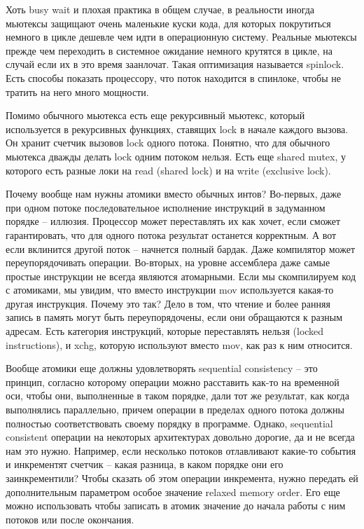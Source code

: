 \documentclass[12pt, a4paper]{article}
\begin{document}
Хоть busy wait и плохая практика в общем случае, в реальности иногда мьютексы защищают очень маленькие куски кода, для которых покрутиться немного в цикле дешевле чем идти в операционную систему. Реальные мьютексы прежде чем переходить в системное ожидание немного крутятся в цикле, на случай если их в это время заанлочат. Такая оптимизация называется spinlock. Есть способы показать процессору, что поток находится в спинлоке, чтобы не тратить на него много мощности.
\par Помимо обычного мьютекса есть еще рекурсивный мьютекс, который используется в рекурсивных функциях, ставящих lock в начале каждого вызова. Он хранит счетчик вызовов lock одного потока. Понятно, что для обычного мьютекса дважды делать lock одним потоком нельзя. Есть еще shared mutex, у которого есть разные локи на read (shared lock) и на write (exclusive lock).\\
\par Почему вообще нам нужны атомики вместо обычных интов? Во-первых, даже при одном потоке последовательное исполнение инструкций в задуманном порядке -- иллюзия. Процессор может переставлять их как хочет, если сможет гарантировать, что для одного потока результат останется корректным. А вот если вклинится другой поток -- начнется полный бардак. Даже компилятор может переупорядочивать операции. Во-вторых, на уровне ассемблера даже самые простые инструкции не всегда являются атомарными. Если мы скомпилируем код с атомиками, мы увидим, что вместо инструкции mov используется какая-то другая инструкция. Почему это так? Дело в том, что чтение и более ранняя запись в память могут быть переупорядочены, если они обращаются к разным адресам. Есть категория инструкций, которые переставлять нельзя (locked instructions), и xchg, которую используют вместо mov, как раз к ним относится.
\par Вообще атомики еще должны удовлетворять sequential consistency -- это принцип, согласно которому операции можно расставить как-то на временной оси, чтобы они, выполненные в таком порядке, дали тот же результат, как когда выполнялись параллельно, причем операции в пределах одного потока должны полностью соответствовать своему порядку в программе. Однако, sequential consistent операции на некоторых архитектурах довольно дорогие, да и не всегда нам это нужно. Например, если несколько потоков отлавливают какие-то события и инкрементят счетчик -- какая разница, в каком порядке они его заинкрементили? Чтобы сказать об этом операции инкремента, нужно передать ей дополнительным параметром особое значение relaxed memory order. Его еще можно использовать чтобы записать в атомик значение до начала работы с ним потоков или после окончания.
\end{document}
